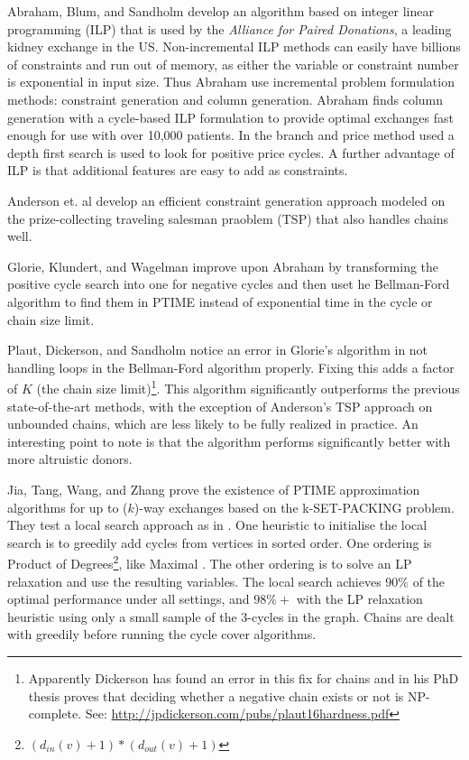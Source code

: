 \documentclass[main.tex]{subfiles}
\begin{document}
Abraham, Blum, and Sandholm \cite{Abr1} develop an algorithm based on integer linear programming (ILP) that is used by the \textit{Alliance for Paired Donations}, a leading kidney exchange in the US. Non-incremental ILP methods can easily have billions of constraints and run out of memory, as either the variable or constraint number is exponential in input size. Thus Abraham use incremental problem formulation methods: constraint generation and column generation. Abraham finds column generation with a cycle-based ILP formulation to provide optimal exchanges fast enough for use with over 10,000 patients. In the branch and price method used a depth first search is used to look for positive price cycles. A further advantage of ILP is that additional features are easy to add as constraints.

Anderson et. al \cite{And3} develop an efficient constraint generation approach modeled on the prize-collecting traveling salesman praoblem (TSP) that also handles chains well.

Glorie, Klundert, and Wagelman \cite{Glo1} improve upon Abraham \cite{Abr1} by transforming the positive cycle search into one for negative cycles and then uset he Bellman-Ford algorithm to find them in PTIME instead of exponential time in the cycle or chain size limit.

Plaut, Dickerson, and Sandholm \cite{Pla} notice an error in Glorie's algorithm \cite{Glo1} in not handling loops in the Bellman-Ford algorithm properly. Fixing this adds a factor of $K$ (the chain size limit)\footnote{Apparently Dickerson has found an error in this fix for chains and in his PhD thesis \cite{Dick} proves that deciding whether a negative chain exists or not is NP-complete. See: \url{http://jpdickerson.com/pubs/plaut16hardness.pdf}}. This algorithm significantly outperforms the previous state-of-the-art methods, with the exception of Anderson's TSP approach \cite{And3} on unbounded chains, which are less likely to be fully realized in practice. An interesting point to note is that the algorithm performs significantly better with more altruistic donors.

Jia, Tang, Wang, and Zhang \cite{Jia1} prove the existence of PTIME approximation algorithms for up to ($ k$)-way exchanges based on the k-SET-PACKING problem. They test a local search approach as in \cite{Abb1}. One heuristic to initialise the local search is to greedily add cycles from vertices in sorted order. One ordering is Product of Degrees\footnote{$(d_{in}(v) + 1)*(d_{out}(v) + 1)$}, like Maximal \cite{Abb1}. The other ordering is to solve an LP relaxation and use the resulting variables. The local search achieves $90\%$ of the optimal performance under all settings, and $98\%+$ with the LP relaxation heuristic using only a small sample of the 3-cycles in the graph. Chains are dealt with greedily before running the cycle cover algorithms.
\end{document}
